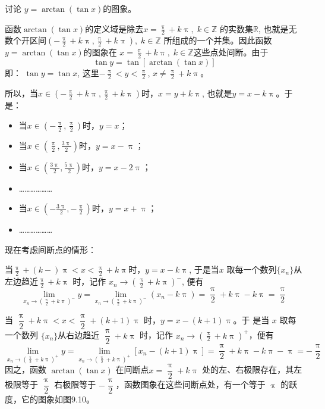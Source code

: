 \begin{example}
    讨论 $y=\arctan (\tan x)$的图象。
\end{example}

\begin{solution}
函数$\arctan (\tan x)$的定义域是除去$x=\frac{\uppi}{2}+k\uppi,\; k\in\mathbb{Z}$
的实数集$\mathbb{R}$, 也就是无数个开区间$\left(-\frac{\uppi}{2}+k\uppi,\frac{\uppi}{2}+k\uppi\right),\; k\in\mathbb{Z}$
所组成的一个并集。因此函数$y=\arctan (\tan x)$的图象在
$x=\frac{\uppi}{2}+k\uppi,\; k\in\mathbb{Z}$这些点处间断。由于
\[\tan y=\tan[\arctan(\tan x)]\]
即：
$\tan y=\tan x$, 这里$-\frac{\uppi}{2}<y<\frac{\uppi}{2}$, $x\ne \frac{\uppi}{2}+k\uppi$。

所以，当$x\in\left(-\frac{\uppi}{2}+k\uppi,\frac{\uppi}{2}+k\uppi\right)$时，$x=y+k\uppi$, 也就是$y=x-k\uppi$。于是：
\begin{itemize}
    \item 当$x\in\left(-\frac{\uppi}{2},\frac{\uppi}{2}\right)$时，$y=x$；
    \item 当$x\in\left(\frac{\uppi}{2},\frac{3\uppi}{2}\right)$时，$y=x-\uppi$；
    \item 当$x\in\left(\frac{3\uppi}{2},\frac{5\uppi}{2}\right)$时，$y=x-2\uppi$；
    \item ………………
    \item 当$x\in\left(-\frac{3\uppi}{2},-\frac{\uppi}{2}\right)$时，$y=x+\uppi$；
    \item ………………
\end{itemize}
现在考虑间断点的情形：

当$\frac{\uppi}{2}+(k-)\uppi<x<\frac{\uppi}{2}+k\uppi$时，$y=x-k\uppi$, 于是当$x$
取每一个数列$\{x_n\}$从左边趋近$\frac{\uppi}{2}+k\uppi$ 时，记作
$x_n\to \left(\frac{\uppi}{2}+k\uppi \right)^-$, 
便有
\[\lim_{x_n\to \left(\tfrac{\uppi}{2}+k\uppi \right)^-}y=\lim_{x_n\to \left(\tfrac{\uppi}{2}+k\uppi \right)^-}(x_n-k\uppi)=\frac{\uppi}{2}+k\uppi-k\uppi=\frac{\uppi}{2}\]

当 $\dfrac{\uppi}{2}+k\uppi <x<\dfrac{\uppi}{2}+(k+1)\uppi$ 时，$y=x-(k+1)\uppi$。于
是当 $x$ 取每一个数列 $\{x_n\}$从右边趋近 $\dfrac{\uppi}{2}+k\uppi$ 时，记作 $x_n\to \left(\frac{\uppi}{2}+k\uppi\right)^+$，便有
\[\lim_{x_n\to \left(\tfrac{\uppi}{2}+k\uppi \right)^+}y=\lim_{x_n\to \left(\tfrac{\uppi}{2}+k\uppi \right)^+}[x_n-(k+1)\uppi]=\frac{\uppi}{2}+k\uppi-k\uppi-\uppi=-\frac{\uppi}{2}\]
因之，函数 $\arctan(\tan x)$ 在间断点$x=\dfrac{\uppi}{2}+k\uppi$ 处的左、右极限存在，其左极限等于 $\dfrac{\uppi}{2}$ 右极限等于 $-\dfrac{\uppi}{2}$，函数图象在这些间断点处，有一个等于 $\uppi$ 的跃度，它的图象如图9.10。


\end{solution}
